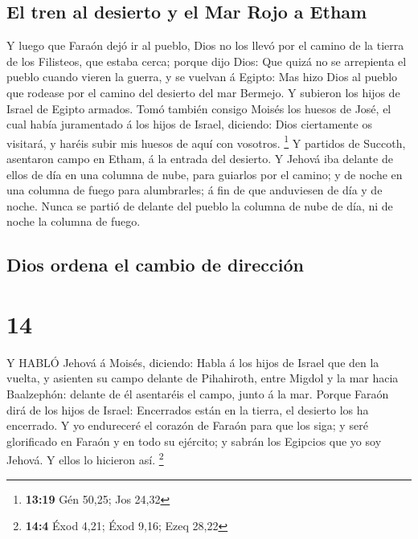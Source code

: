 \hypertarget{el-tren-al-desierto-y-el-mar-rojo-a-etham}{%
\subsection{El tren al desierto y el Mar Rojo a
Etham}\label{el-tren-al-desierto-y-el-mar-rojo-a-etham}}

 Y luego que Faraón dejó ir al pueblo, Dios no los llevó
por el camino de la tierra de los Filisteos, que estaba cerca; porque
dijo Dios: Que quizá no se arrepienta el pueblo cuando vieren la guerra,
y se vuelvan á Egipto:  Mas hizo Dios al pueblo que rodease
por el camino del desierto del mar Bermejo. Y subieron los hijos de
Israel de Egipto armados.  Tomó también consigo Moisés los
huesos de José, el cual había juramentado á los hijos de Israel,
diciendo: Dios ciertamente os visitará, y haréis subir mis huesos de
aquí con vosotros. \footnote{\textbf{13:19} Gén 50,25; Jos 24,32}
 Y partidos de Succoth, asentaron campo en Etham, á la
entrada del desierto.  Y Jehová iba delante de ellos de día
en una columna de nube, para guiarlos por el camino; y de noche en una
columna de fuego para alumbrarles; á fin de que anduviesen de día y de
noche.  Nunca se partió de delante del pueblo la columna de
nube de día, ni de noche la columna de fuego.

\hypertarget{dios-ordena-el-cambio-de-direcciuxf3n}{%
\subsection{Dios ordena el cambio de
dirección}\label{dios-ordena-el-cambio-de-direcciuxf3n}}

\hypertarget{section-13}{%
\section{14}\label{section-13}}

 Y HABLÓ Jehová á Moisés, diciendo:  Habla á los
hijos de Israel que den la vuelta, y asienten su campo delante de
Pihahiroth, entre Migdol y la mar hacia Baalzephón: delante de él
asentaréis el campo, junto á la mar.  Porque Faraón dirá de
los hijos de Israel: Encerrados están en la tierra, el desierto los ha
encerrado.  Y yo endureceré el corazón de Faraón para que
los siga; y seré glorificado en Faraón y en todo su ejército; y sabrán
los Egipcios que yo soy Jehová. Y ellos lo hicieron así. \footnote{\textbf{14:4}
  Éxod 4,21; Éxod 9,16; Ezeq 28,22}

